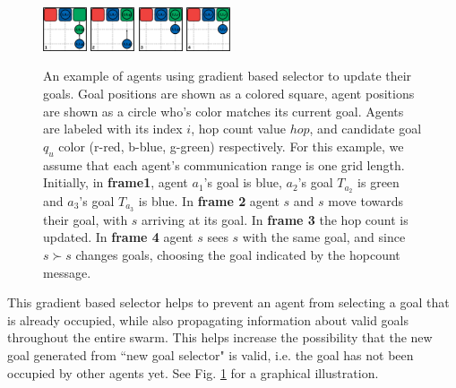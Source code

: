 \documentclass[journal]{IEEEtran}
\begin{document}
\begin{figure}[t]
\centering
\includegraphics[width=0.115\textwidth]{IEEEtran/hopcount/1.jpg}
\includegraphics[width=0.115\textwidth]{IEEEtran/hopcount/2.jpg}
\includegraphics[width=0.115\textwidth]{IEEEtran/hopcount/3.jpg}
\includegraphics[width=0.115\textwidth]{IEEEtran/hopcount/4.jpg}

\caption{An example of agents using gradient based selector to update their goals. Goal positions are shown as a colored square, agent positions are shown as a circle who's color matches its current goal. Agents are labeled with its index $i$, hop count value $hop$, and candidate goal $q_u$ color (r-red, b-blue, g-green) respectively. For this example, we assume that each agent's communication range is one grid length. Initially, in \textbf{frame1}, agent $a_1$'s goal is blue, $a_2$'s goal $T_{a_2}$ is green and $a_3$'s goal $T_{a_3}$ is blue. In \textbf{frame 2} agent $s$ and $s$ move towards their goal, with $s$ arriving at its goal.  In \textbf{frame 3} the hop count is updated.  In \textbf{frame 4} agent $s$ sees $s$ with the same goal, and since $s \succ s$ changes goals, choosing the goal indicated by the hopcount message.}
\label{fig:hop}
\end{figure}




This gradient based selector helps to prevent an agent from selecting a goal that is already occupied, while also propagating information about valid goals throughout the entire swarm.  This helps increase the possibility that the new goal generated from ``new goal selector" is valid, i.e. the goal has not been occupied by other agents yet. See Fig. \ref{fig:hop} for a graphical illustration.
\end{document}
